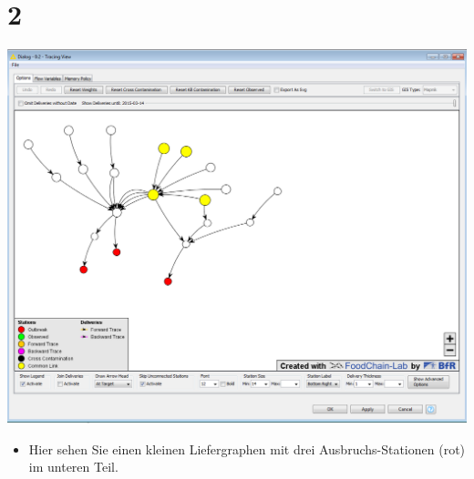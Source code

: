 \documentclass{beamer}
\begin{document}
\section{2}
\begin{frame}
	\begin{center}
  		\includegraphics[height=0.6\textheight]{2.png}
	\end{center}
	\begin{itemize}
		\item Hier sehen Sie einen kleinen Liefergraphen mit drei Ausbruchs-Stationen (rot) im unteren Teil.
	\end{itemize}
\end{frame}
\end{document}
